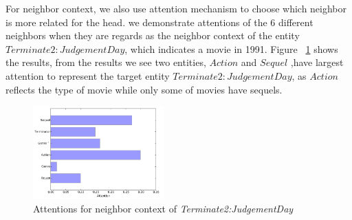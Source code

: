 \begin{table}
 \centering
 \caption{Attention Results in Path Context}
  \label{Attention Results in Path Context}
  \small
\end{table}

For neighbor context, we also use attention mechanism to choose which neighbor is more related for the head. we demonstrate attentions of the 6 different neighbors when they are regards as the neighbor context of the entity $Terminate2:JudgementDay$, which indicates a movie in 1991. Figure ~\ref{pic2}  shows the results, from the results we see two entities, $Action$ and $Sequel$ ,have largest attention to represent the target entity $Terminate2:JudgementDay$, as $Action$  reflects the type of movie while only some of movies have sequels.
\begin{figure}
  \includegraphics[width=0.45\textwidth]{pic2.png}
  \caption{Attentions for neighbor context of  \emph{Terminate2:JudgementDay}}
  \label{pic2}
\end{figure}








